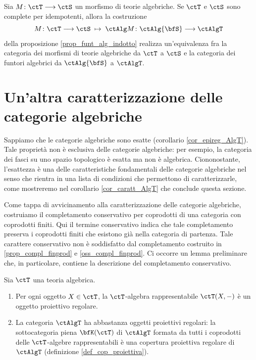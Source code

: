 \begin{proposition}\label{prop_dualita_alg}
 Sia \(M \colon \ctT \fun \ctS\) un morfismo di teorie algebriche. Se \(\ctT\) e \(\ctS\) sono complete per idempotenti,
 allora la costruzione
 \[ M \colon \ctT \fun \ctS \; \mapsto \; \ctAlg M \colon \ctAlg{\bfS} \fun \ctAlgT \]
 della proposizione \ref{prop_funt_alg_indotto} realizza un'equivalenza fra la categoria dei morfismi di teorie algebriche
 da \(\ctT\) a \(\ctS\) e la categoria dei funtori algebrici da \(\ctAlg{\bfS}\) a \(\ctAlgT\).
\end{proposition}

\section{Un'altra caratterizzazione delle categorie algebriche}\label{sec_caract_AlgT_exact}

Sappiamo che le categorie algebriche sono esatte (corollario \ref{cor_epireg_AlgT}). Tale proprietà non è esclusiva delle
categorie algebriche: per esempio, la categoria dei fasci su uno spazio topologico è esatta ma non è algebrica. Ciononostante,
l'esattezza è una delle caratteristiche fondamentali delle categorie algebriche nel senso che rientra in una lista di condizioni che
permettono di caratterizzarle, come mostreremo nel corollario \ref{cor_caratt_AlgT} che conclude questa sezione.

Come tappa di avvicinamento alla caratterizzazione delle categorie algebriche, costruiamo il completamento conservativo
per coprodotti di una categoria con coprodotti finiti. Qui il termine conservativo indica che tale completamento preserva i
coprodotti finiti che esistono già nella categoria di partenza. Tale carattere conservativo non è soddisfatto dal completamento
costruito in \ref{prop_compl_finprod} e \ref{oss_compl_finprod}. Ci occorre un lemma preliminare che, in particolare, contiene
la descrizione del completamento conservativo.

\begin{lemma}\label{lemma_rappr_proj}
 Sia \(\ctT\) una teoria algebrica.
 \begin{enumerate}
  \item Per ogni oggetto \(X \in \ctT\), la \(\ctT\)-algebra rappresentabile \(\ctT(X,-)\) è un oggetto proiettivo regolare.
  \item La categoria \(\ctAlgT\) ha abbastanza oggetti proiettivi regolari: la sottocategoria piena \(\bfK(\ctT)\) di \(\ctAlgT\)
        formata da tutti i coprodotti delle \(\ctT\)-algebre rappresentabili è una copertura proiettiva regolare di \(\ctAlgT\)
        (definizione \ref{def_cop_proiettiva}).
 \end{enumerate}
\end{lemma}

